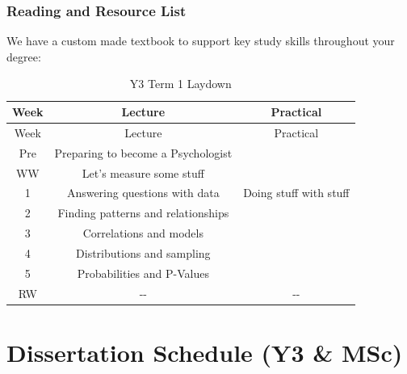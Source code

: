 \documentclass[
  11pt,
  letterpaper,
  oneside,
  open=any]{scrbook}
\begin{document}
\hypertarget{reading-and-resource-list-2}{%
\subsection{Reading and Resource
List}\label{reading-and-resource-list-2}}

We have a custom made textbook to support key study skills throughout
your degree:

\newpage

\begin{longtable}[]{@{}ccc@{}}
\caption{Y3 Term 1 Laydown}\tabularnewline
\toprule()
Week & Lecture & Practical \\
\midrule()
\endfirsthead
\toprule()
Week & Lecture & Practical \\
\midrule()
\endhead
Pre & Preparing to become a Psychologist & \\
WW & Let's measure some stuff & \\
1 & Answering questions with data & Doing stuff with stuff \\
2 & Finding patterns and relationships & \\
3 & Correlations and models & \\
4 & Distributions and sampling & \\
5 & Probabilities and P-Values & \\
RW & -\/- & -\/- \\
\bottomrule()
\end{longtable}

\hypertarget{dissertation-schedule-y3-msc}{%
\chapter{Dissertation Schedule (Y3 \&
MSc)}\label{dissertation-schedule-y3-msc}}
\end{document}
